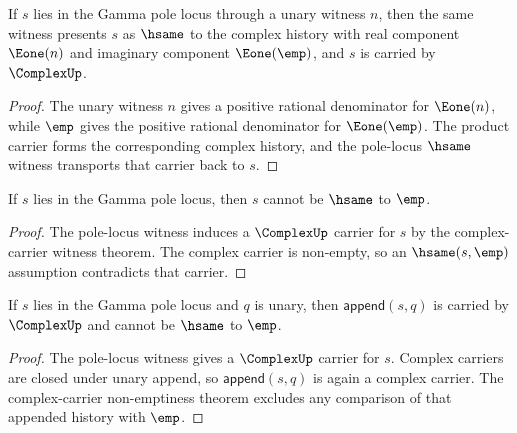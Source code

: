 \begin{theorem}
\label{thm:gamma-pole-locus-complex-carrier}
If \(s\) lies in the Gamma pole locus through a unary witness \(n\), then the same witness presents \(s\) as \(\hsame\) to the complex history with real component \(\Eone(n)\) and imaginary component \(\Eone(\emp)\), and \(s\) is carried by \(\ComplexUp\).
\end{theorem}
\begin{proof}
The unary witness \(n\) gives a positive rational denominator for \(\Eone(n)\), while \(\emp\) gives the positive rational denominator for \(\Eone(\emp)\). The product carrier forms the corresponding complex history, and the pole-locus \(\hsame\) witness transports that carrier back to \(s\).
\end{proof}

\begin{theorem}
\label{thm:gamma-pole-locus-not-empty}
If \(s\) lies in the Gamma pole locus, then \(s\) cannot be \(\hsame\) to
\(\emp\).
\end{theorem}
\begin{proof}
The pole-locus witness induces a \(\ComplexUp\) carrier for \(s\) by the
complex-carrier witness theorem. The complex carrier is non-empty, so an
\(\hsame(s,\emp)\) assumption contradicts that carrier.
\end{proof}

\begin{theorem}
\label{thm:gamma-pole-locus-append-unary-complex-carrier}
If $s$ lies in the Gamma pole locus and $q$ is unary, then
$\mathsf{append}(s,q)$ is carried by $\ComplexUp$ and cannot be $\hsame$ to
$\emp$.
\end{theorem}
\begin{proof}
The pole-locus witness gives a $\ComplexUp$ carrier for $s$. Complex carriers
are closed under unary append, so $\mathsf{append}(s,q)$ is again a complex
carrier. The complex-carrier non-emptiness theorem excludes any comparison of
that appended history with $\emp$.
\end{proof}

